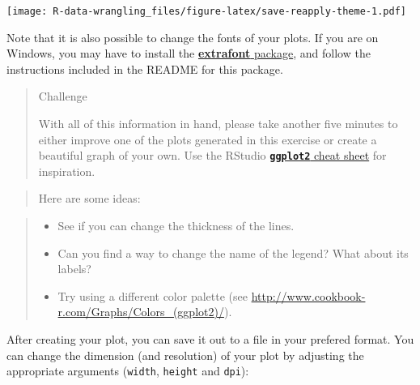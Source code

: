 \documentclass[]{book}
\providecommand{\tightlist}{%
  \setlength{\itemsep}{0pt}\setlength{\parskip}{0pt}}
\theoremstyle{definition}
\theoremstyle{definition}
\theoremstyle{definition}
\theoremstyle{remark}
\begin{document}
\texttt{[image: R-data-wrangling\_files/figure-latex/save-reapply-theme-1.pdf]}

Note that it is also possible to change the fonts of your plots. If you
are on Windows, you may have to install the
\href{https://github.com/wch/extrafont}{\textbf{extrafont} package}, and
follow the instructions included in the README for this package.

\begin{quote}
Challenge

With all of this information in hand, please take another five minutes
to either improve one of the plots generated in this exercise or create
a beautiful graph of your own. Use the RStudio
\href{https://www.rstudio.com/wp-content/uploads/2016/11/ggplot2-cheatsheet-2.1.pdf}{\textbf{\texttt{ggplot2}}
cheat sheet} for inspiration.
\end{quote}

\begin{quote}
Here are some ideas:
\end{quote}

\begin{quote}
\begin{itemize}
\tightlist
\item
  See if you can change the thickness of the lines.
\item
  Can you find a way to change the name of the legend? What about its
  labels?
\item
  Try using a different color palette (see
  \url{http://www.cookbook-r.com/Graphs/Colors_(ggplot2)/}).
\end{itemize}
\end{quote}

After creating your plot, you can save it out to a file in your prefered
format. You can change the dimension (and resolution) of your plot by
adjusting the appropriate arguments (\texttt{width}, \texttt{height} and
\texttt{dpi}):
\end{document}
